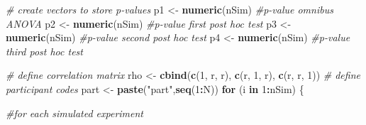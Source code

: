 \documentclass[]{book}
\newenvironment{Shaded}{\begin{snugshade}}{\end{snugshade}}
\newcommand{\CommentTok}[1]{\textcolor[rgb]{0.56,0.35,0.01}{\textit{#1}}}
\newcommand{\ControlFlowTok}[1]{\textcolor[rgb]{0.13,0.29,0.53}{\textbf{#1}}}
\newcommand{\DecValTok}[1]{\textcolor[rgb]{0.00,0.00,0.81}{#1}}
\newcommand{\KeywordTok}[1]{\textcolor[rgb]{0.13,0.29,0.53}{\textbf{#1}}}
\newcommand{\NormalTok}[1]{#1}
\newcommand{\OperatorTok}[1]{\textcolor[rgb]{0.81,0.36,0.00}{\textbf{#1}}}
\newcommand{\StringTok}[1]{\textcolor[rgb]{0.31,0.60,0.02}{#1}}
\begin{document}
\begin{Shaded}
\begin{Highlighting}[]
\CommentTok{# create vectors to store p-values}
\NormalTok{p1 <-}\StringTok{ }\KeywordTok{numeric}\NormalTok{(nSim) }\CommentTok{#p-value omnibus ANOVA}
\NormalTok{p2 <-}\StringTok{ }\KeywordTok{numeric}\NormalTok{(nSim) }\CommentTok{#p-value first post hoc test}
\NormalTok{p3 <-}\StringTok{ }\KeywordTok{numeric}\NormalTok{(nSim) }\CommentTok{#p-value second post hoc test}
\NormalTok{p4 <-}\StringTok{ }\KeywordTok{numeric}\NormalTok{(nSim) }\CommentTok{#p-value third post hoc test}

\CommentTok{# define correlation matrix}
\NormalTok{rho <-}\StringTok{ }\KeywordTok{cbind}\NormalTok{(}\KeywordTok{c}\NormalTok{(}\DecValTok{1}\NormalTok{, r, r), }\KeywordTok{c}\NormalTok{(r, }\DecValTok{1}\NormalTok{, r), }\KeywordTok{c}\NormalTok{(r, r, }\DecValTok{1}\NormalTok{))}
\CommentTok{# define participant codes}
\NormalTok{part <-}\StringTok{ }\KeywordTok{paste}\NormalTok{(}\StringTok{"part"}\NormalTok{,}\KeywordTok{seq}\NormalTok{(}\DecValTok{1}\OperatorTok{:}\NormalTok{N))}
\ControlFlowTok{for}\NormalTok{ (i }\ControlFlowTok{in} \DecValTok{1}\OperatorTok{:}\NormalTok{nSim) \{}
  
  \CommentTok{#for each simulated experiment}


\end{Highlighting}
\end{Shaded}
\end{document}
